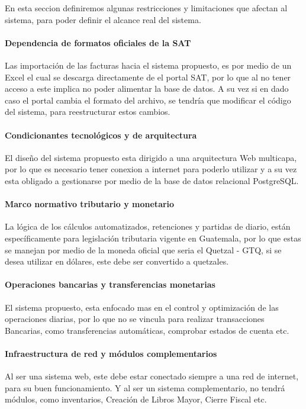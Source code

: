 En esta seccion definiremos algunas restricciones y limitaciones que afectan al sistema, para poder definir el alcance real del sistema.

\paragraph{Dependencia de formatos oficiales de la SAT} Las importación de las facturas hacia el sistema propuesto, es por medio de un Excel el cual se descarga directamente de el portal SAT, por lo que al no tener acceso a este implica no poder alimentar la base de datos. A su vez si en dado caso el portal cambia el formato del archivo, se tendría que modificar el código del sistema, para reestructurar estos cambios.

\paragraph{Condicionantes tecnológicos y de arquitectura} El diseño del sistema propuesto esta dirigido a una arquitectura Web multicapa, por lo que es necesario tener conexion a internet para poderlo utilizar y a su vez esta obligado a gestionarse por medio de la base de datos relacional PostgreSQL.

\paragraph{Marco normativo tributario y monetario} La lógica de los cálculos automatizados, retenciones y partidas de diario, están específicamente para legislación tributaria vigente en Guatemala, por lo que estas se manejan por medio de la moneda oficial que seria el Quetzal - GTQ, si se desea utilizar en dólares, este debe ser convertido a quetzales.

\paragraph{Operaciones bancarias y transferencias monetarias} El sistema propuesto, esta enfocado mas en el control y optimización de las operaciones diarias, por lo que no se vincula para realizar transacciones Bancarias, como transferencias automáticas, comprobar estados de cuenta etc.

\paragraph{Infraestructura de red y módulos complementarios} Al ser una sistema web, este debe estar conectado siempre a una red de internet, para su buen funcionamiento. Y al ser un sistema complementario, no tendrá módulos, como inventarios, Creación de Libros Mayor, Cierre Fiscal etc.

